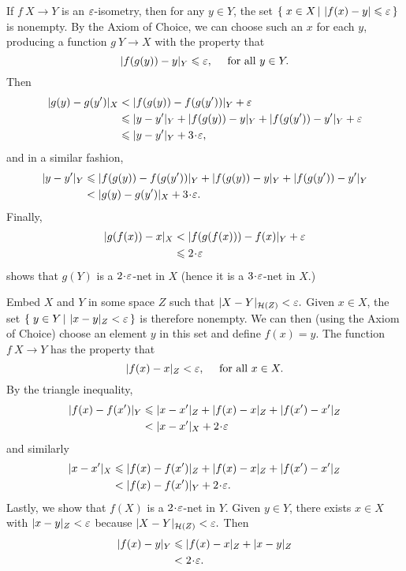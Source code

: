 If $f\: X \to Y$ is an $\varepsilon$-isometry, then for any $y \in Y$, the set $\set{x \in X}{|f(x) - y| \le \eps}$ is nonempty.  By the Axiom of Choice, we can choose such an $x$ for each $y$, producing a function $g\: Y \to X$ with the property that
$$|f(g(y)) - y|_Y \leqslant \varepsilon, \quad \text{ for all } y \in Y.$$  
Then
\begin{align*}
|g(y) - g(y')|_X &< |f(g(y)) - f(g(y'))|_Y + \eps\\
&\le |y - y'|_Y + |f(g(y)) - y|_Y + |f(g(y')) - y'|_Y + \eps\\
&\le |y - y'|_Y + 3\cdot\eps,
\end{align*} and in a similar fashion,
\begin{align*}
|y - y'|_Y &\le |f(g(y)) - f(g(y'))|_Y + |f(g(y)) - y|_Y + |f(g(y')) - y'|_Y\\
&< |g(y) - g(y')|_X + 3\cdot\eps.
\end{align*}  
Finally,
\begin{align*}
|g(f(x)) - x|_X 
&< |f(g(f(x))) - f(x)|_Y + \eps 
\\
&\le 2\cdot\eps\end{align*}
shows that $g(Y)$ is a $2\cdot\eps$-net in $X$ (hence it is a $3\cdot\eps$-net in $X$.)


 Embed $X$ and $Y$ in some space $Z$ such that $|X - Y|_{\mathcal{H}(Z)} < \varepsilon.$  Given $x \in X$, the set $\set{y \in Y}{|x - y|_Z < \eps}$ is therefore nonempty.  We can then (using the Axiom of Choice) choose an element $y$ in this set and define $f(x) = y$.  
The function $f\: X \to Y$ has the property that 
$$|f(x) - x|_Z < \varepsilon, \quad \text{ for all }x \in X.$$  
By the triangle inequality,
\begin{align*}
|f(x) - f(x')|_Y 
&\le |x - x'|_Z + |f(x) - x|_Z + |f(x') - x'|_Z 
\\
&< |x - x'|_X + 2\cdot\eps
\end{align*}
and similarly
\begin{align*}
|x - x'|_X 
&\le 
|f(x) - f(x')|_Z + |f(x) - x|_Z + |f(x') - x'|_Z 
\\
&< 
|f(x) - f(x')|_Y + 2\cdot\eps.
\end{align*}
Lastly, we show that $f(X)$ is a $2\cdot\eps$-net in $Y$.  Given $y \in Y$, there exists $x \in X$ with $|x - y|_Z < \varepsilon$ because $|X - Y|_{\mathcal{H}(Z)} < \varepsilon.$  Then
\begin{align*}
|f(x) - y|_Y 
&\le 
|f(x) - x|_Z + |x - y|_Z 
\\
&< 2\cdot\eps.
\end{align*}



